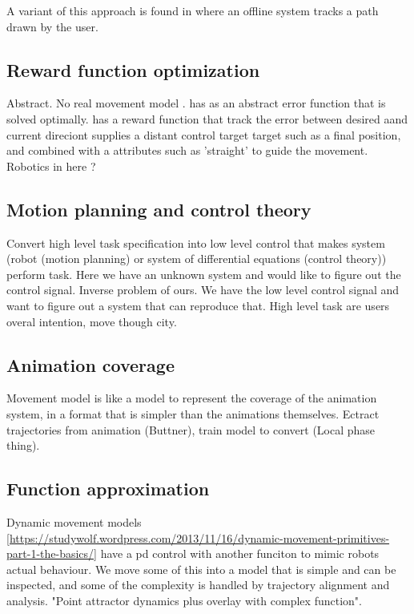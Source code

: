 A variant of this approach is found in \citep{treuille07} where an offline system tracks a path drawn by the user.

\subsection{Reward function optimization}
Abstract. No real movement model .
\citep{kovar02} has as an abstract error function that is solved optimally.
\citep{lee10} has a reward function that track the error between desired aand current direciont
\citep{lee18} supplies a distant control target target such as a final position, and combined with a attributes such as 'straight' to guide the movement.
Robotics in here ?

\subsection{Motion planning and control theory}
Convert high level task specification into low level control that makes system (robot (motion planning) or system of differential equations (control theory)) perform task.
Here we have an unknown system and would like to figure out the control signal. Inverse problem of ours. We have the low level control signal and want to figure out a system that can reproduce that. High level task are users overal intention, move though city.

\subsection{Animation coverage}
Movement model is like a model to represent the coverage of the animation system, in a format that is simpler than the animations themselves. Ectract trajectories from animation (Buttner), train model to convert (Local phase thing). 

\subsection{Function approximation}

Dynamic movement models \ref{https://studywolf.wordpress.com/2013/11/16/dynamic-movement-primitives-part-1-the-basics/} have a pd control with another funciton to mimic robots actual behaviour. We move some of this into a model that is simple and can be inspected, and some of the complexity is handled by trajectory alignment and analysis. "Point attractor dynamics plus overlay with complex function".

